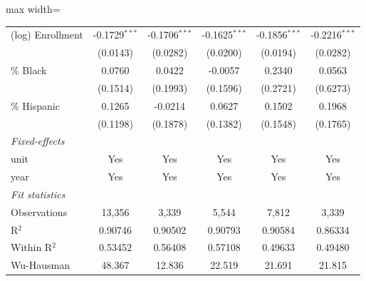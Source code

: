 \documentclass[
  10pt,
]{article}
\begin{document}
\begin{table}[htbp]
\begin{adjustbox}{max width=\textwidth}
\begin{tabular}{lccccc}
         (log) Enrollment                               & -0.1729$^{***}$        & -0.1706$^{***}$       & -0.1625$^{***}$       & -0.1856$^{***}$       & -0.2216$^{***}$\\   
                                                        & (0.0143)               & (0.0282)              & (0.0200)              & (0.0194)              & (0.0282)\\   
         \% Black                                       & 0.0760                 & 0.0422                & -0.0057               & 0.2340                & 0.0563\\   
                                                        & (0.1514)               & (0.1993)              & (0.1596)              & (0.2721)              & (0.6273)\\   
         \% Hispanic                                    & 0.1265                 & -0.0214               & 0.0627                & 0.1502                & 0.1968\\   
                                                        & (0.1198)               & (0.1878)              & (0.1382)              & (0.1548)              & (0.1765)\\   
         \midrule
         \emph{Fixed-effects}\\
         unit                                           & Yes                    & Yes                   & Yes                   & Yes                   & Yes\\  
         year                                           & Yes                    & Yes                   & Yes                   & Yes                   & Yes\\  
         \midrule
         \emph{Fit statistics}\\
         Observations                                   & 13,356                 & 3,339                 & 5,544                 & 7,812                 & 3,339\\  
         R$^2$                                          & 0.90746                & 0.90502               & 0.90793               & 0.90584               & 0.86334\\  
         Within R$^2$                                   & 0.53452                & 0.56408               & 0.57108               & 0.49633               & 0.49480\\  
         Wu-Hausman                                     & 48.367                 & 12.836                & 22.519                & 21.691                & 21.815\\  

\end{tabular}
\end{adjustbox}
\end{table}
\end{document}
